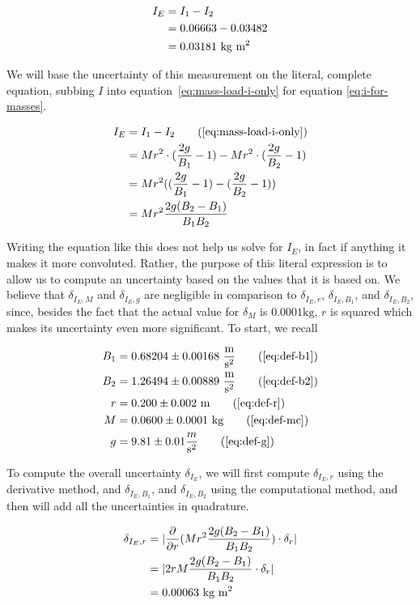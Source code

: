 \documentclass[coverpage]{article}
\newcommand{\iUnit}{\text{kg $\text{m}^2$}}
\newcommand{\mpssq}{\frac{\text{m}}{\text{s}^2}}
\begin{document}
	\begin{align}
		I_E &= I_1 - I_2 \label{eq:mass-load-i-only} \\
		&= 0.06663 - 0.03482 \notag \\
		&= 0.03181\ \iUnit
	\end{align}
	
	We will base the uncertainty of this measurement on the literal, complete equation, subbing $I$ into equation~\ref{eq:mass-load-i-only} for equation \ref{eq:i-for-masses}.
	
	\begin{align}
		I_E &= I_1 - I_2 \tag{\ref{eq:mass-load-i-only}} \\
		&= M r^2 \cdot (\frac{2g}{B_1} - 1) - Mr^2 \cdot (\frac{2g}{B_2} - 1) \notag \\
		&= M r^2 ((\frac{2g}{B_1} - 1) - (\frac{2g}{B_2} - 1)) \notag \\
		&= M r^2 \frac{2g(B_2 - B_1)}{B_1 B_2}
	\end{align}

	Writing the equation like this does not help us solve for $I_E$, in fact if anything it makes it more convoluted. Rather, the purpose of this literal expression is to allow us to compute an uncertainty based on the values that it is based on. We believe that $\delta_{I_E, M}$ and $\delta_{I_E, g}$ are negligible in comparison to $\delta_{I_E, r}$, $\delta_{I_E, B_1}$, and $\delta_{I_E, B_2}$, since, besides the fact that the actual value for $\delta_M$ is $0.0001 \text{kg}$, $r$ is squared which makes its uncertainty even more significant. To start, we recall
	
	\begin{align}
		B_1 &= 0.68204 \pm 0.00168\ \mpssq \tag{\ref{eq:def-b1}} \\
		B_2 &= 1.26494 \pm 0.00889\ \mpssq \tag{\ref{eq:def-b2}} \\
		r &= 0.200 \pm 0.002\ \text{m} \tag{\ref{eq:def-r}} \\
		M &= 0.0600 \pm 0.0001\ \text{kg} \tag{\ref{eq:def-mc}} \notag \\
		g &= 9.81 \pm 0.01 \frac{m}{\text{s}^2} \tag{\ref{eq:def-g}}
	\end{align}
	
	To compute the overall uncertainty $\delta_{I_E}$, we will first compute $\delta_{I_E, r}$ using the derivative method, and $\delta_{I_E, B_1}$, and $\delta_{I_E, B_2}$ using the computational method, and then will add all the uncertainties in quadrature.
	
	\begin{align}
		\delta_{I_E, r} &= |\frac{\partial}{\partial r}(M r^2 \frac{2g(B_2 - B_1)}{B_1 B_2}) \cdot \delta_r| \notag \\
		&= |2r M \frac{2g(B_2 - B_1)}{B_1 B_2} \cdot \delta_r| \notag \\
		&= 0.00063\ \iUnit
	\end{align}
\end{document}
